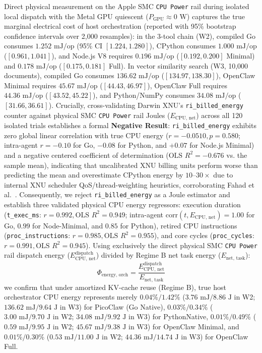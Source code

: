\documentclass[preprint,12pt,3p]{elsarticle}
\begin{document}
Direct physical measurement on the Apple SMC \texttt{CPU Power} rail during isolated local dispatch with the Metal GPU quiescent ($P_{\text{GPU}} \approx 0\text{ W}$) captures the true marginal electrical cost of host orchestration (reported with 95\% bootstrap confidence intervals over 2,000 resamples): in the 3-tool chain (W2), compiled Go consumes $1.252\text{ mJ/op}$ (95\% CI $[1.224, 1.280]$), CPython consumes $1.000\text{ mJ/op}$ ($[0.961, 1.041]$), and Node.js V8 requires $0.196\text{ mJ/op}$ ($[0.192, 0.200]$ Minimal) and $0.178\text{ mJ/op}$ ($[0.175, 0.181]$ Full). In vector similarity search (W3, 10,000 documents), compiled Go consumes $136.62\text{ mJ/op}$ ($[134.97, 138.30]$), OpenClaw Minimal requires $45.67\text{ mJ/op}$ ($[44.43, 46.97]$), OpenClaw Full requires $44.36\text{ mJ/op}$ ($[43.52, 45.22]$), and Python/NumPy consumes $34.08\text{ mJ/op}$ ($[31.66, 36.61]$). Crucially, cross-validating Darwin XNU's \texttt{ri\_billed\_energy} counter against physical SMC \texttt{CPU Power} rail Joules ($E_{\text{CPU, net}}$) across all 120 isolated trials establishes a formal \textbf{Negative Result}: \texttt{ri\_billed\_energy} exhibits zero global linear correlation with true CPU energy ($r = -0.0510, p = 0.580$; intra-agent $r = -0.10$ for Go, $-0.08$ for Python, and $+0.07$ for Node.js Minimal) and a negative centered coefficient of determination ($\text{OLS } R^2 = -0.676$ vs. the sample mean), indicating that uncalibrated XNU billing units perform worse than predicting the mean and overestimate CPython energy by $10\text{--}30\times$ due to internal XNU scheduler QoS/thread-weighting heuristics, corroborating Fahad et al.~\cite{fahad2019comparative}. Consequently, we reject \texttt{ri\_billed\_energy} as a Joule estimator and establish three validated physical CPU energy regressors: execution duration (\texttt{t\_exec\_ms}: $r = 0.992, \text{OLS } R^2 = 0.949$; intra-agent $\text{corr}(t, E_{\text{CPU, net}}) = 1.00$ for Go, $0.99$ for Node-Minimal, and $0.85$ for Python), retired CPU instructions (\texttt{proc\_instructions}: $r = 0.985, \text{OLS } R^2 = 0.955$), and core cycles (\texttt{proc\_cycles}: $r = 0.991, \text{OLS } R^2 = 0.945$). Using exclusively the direct physical SMC \texttt{CPU Power} rail dispatch energy ($E_{\text{CPU, net}}^{\text{dispatch}}$) divided by Regime B net task energy ($E_{\text{net, task}}$):
\begin{equation}
\Phi_{\text{energy, orch}} = \frac{E_{\text{CPU, net}}^{\text{dispatch}}}{E_{\text{net, task}}}
\end{equation}
we confirm that under amortized KV-cache reuse (Regime B), true host orchestrator CPU energy represents merely $0.04\% / 1.42\%$ ($3.76\text{ mJ} / 8.86\text{ J}$ in W2; $136.62\text{ mJ} / 9.64\text{ J}$ in W3) for PicoClaw (Go Native), $0.03\% / 0.34\%$ ($3.00\text{ mJ} / 9.70\text{ J}$ in W2; $34.08\text{ mJ} / 9.92\text{ J}$ in W3) for PythonNative, $0.01\% / 0.49\%$ ($0.59\text{ mJ} / 9.95\text{ J}$ in W2; $45.67\text{ mJ} / 9.38\text{ J}$ in W3) for OpenClaw Minimal, and $0.01\% / 0.30\%$ ($0.53\text{ mJ} / 11.00\text{ J}$ in W2; $44.36\text{ mJ} / 14.74\text{ J}$ in W3) for OpenClaw Full.
\end{document}
